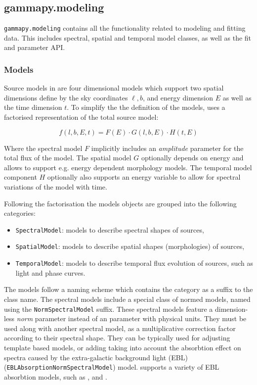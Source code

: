 \documentclass[traditabstract, longauth]{aa}
\newcommand{\code}[1]{\texttt{#1}}
\begin{document}
\subsection{gammapy.modeling}
\label{ssec:gammapy-modeling}
%
\code{gammapy.modeling} contains all the functionality related to modeling and fitting
data. This includes spectral, spatial and temporal model classes, as well as
the fit and parameter API.

\subsubsection{Models}
\label{sssec:models}
Source models in \gammapy are four dimensional models which support two
spatial dimensions define by the sky coordinates $\ell, b$, and energy dimension $E$ as well as
the time dimension $t$. To simplify the the definition of the
models, \gammapy uses a factorised representation of the total source
model:

\begin{equation}
    f(l, b, E, t) = F(E)  \cdot G(l, b, E) \cdot  H(t, E)
\end{equation}

Where the spectral model $F$ implicitly includes an \textit{amplitude} parameter
for the total flux of the model. The spatial model $G$ optionally depends
on energy and allows to support e.g. energy dependent
morphology models. The temporal model component $H$
optionally also supports an energy variable to
allow for spectral variations of the model with time.

Following the factorisation the models objects are grouped
into the following categories:

\begin{itemize}
	\item \code{SpectralModel}: models to describe spectral shapes of sources,
	\item \code{SpatialModel}: models to describe spatial shapes (morphologies) of sources,
	\item \code{TemporalModel}: models to describe temporal flux evolution of sources, such as
	      light and phase curves.
\end{itemize}

The models follow a naming scheme which contains the category as a suffix to
the class name. The spectral models include a special class of normed models,
named using the \code{NormSpectralModel} suffix.
These spectral models feature a dimension-less \textit{norm} parameter
instead of an  parameter with physical units. They
must be used along with another spectral model, as a multiplicative correction
factor according to their spectral shape. They can be typically used for
adjusting template based models, or adding taking into account
the absorbtion effect on 
\gammaray spectra caused by the extra-galactic background light (EBL) (\code{EBLAbsorptionNormSpectralModel})
model. \gammapy supports a variety of EBL absorbtion models, such as
\cite{Franceschini2008}, \cite{Finke2010} and \cite{Dominguez2011}.
\end{document}
